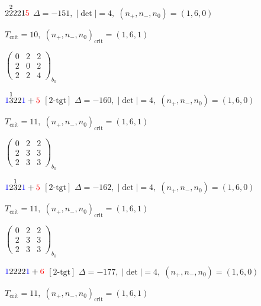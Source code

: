 \documentclass[10pt]{article}
\begin{document}
$2\overset{2}{2}221\textcolor{red}{5}$ \quad $\Delta=-151,\; |\det|=4,\; (n_+,n_-,n_0)=(1,6,0)$

\hspace{1em}$T_{\text{crit}}=10,\; (n_+,n_-,n_0)_{\text{crit}}=(1,6,1)$

\hspace{2em}$\left(\begin{smallmatrix}0 & 2 & 2 \\ 2 & 0 & 2 \\ 2 & 2 & 4\end{smallmatrix}\right)_{\!b_0}$

\smallskip

$\textcolor{blue}{1}\overset{1}{3}22\textcolor{blue}{1}+\textcolor{red}{5}$ $\scriptstyle [2\text{-tgt}]$ \quad $\Delta=-160,\; |\det|=4,\; (n_+,n_-,n_0)=(1,6,0)$

\hspace{1em}$T_{\text{crit}}=11,\; (n_+,n_-,n_0)_{\text{crit}}=(1,6,1)$

\hspace{2em}$\left(\begin{smallmatrix}0 & 2 & 2 \\ 2 & 3 & 3 \\ 2 & 3 & 3\end{smallmatrix}\right)_{\!b_0}$

\smallskip

$\textcolor{blue}{1}2\overset{1}{3}2\textcolor{blue}{1}+\textcolor{red}{5}$ $\scriptstyle [2\text{-tgt}]$ \quad $\Delta=-162,\; |\det|=4,\; (n_+,n_-,n_0)=(1,6,0)$

\hspace{1em}$T_{\text{crit}}=11,\; (n_+,n_-,n_0)_{\text{crit}}=(1,6,1)$

\hspace{2em}$\left(\begin{smallmatrix}0 & 2 & 2 \\ 2 & 3 & 3 \\ 2 & 3 & 3\end{smallmatrix}\right)_{\!b_0}$

\smallskip

$\textcolor{blue}{1}2222\textcolor{blue}{1}+\textcolor{red}{6}$ $\scriptstyle [2\text{-tgt}]$ \quad $\Delta=-177,\; |\det|=4,\; (n_+,n_-,n_0)=(1,6,0)$

\hspace{1em}$T_{\text{crit}}=11,\; (n_+,n_-,n_0)_{\text{crit}}=(1,6,1)$
\end{document}
